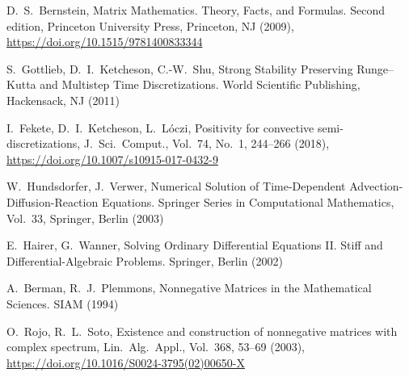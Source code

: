 \documentclass[a4paper]{article}
\begin{document}
\begin{thebibliography}{99}

D.~S.~Bernstein, Matrix Mathematics. Theory, Facts, and Formulas. Second edition, Princeton University Press, Princeton, NJ (2009), \href{https://doi.org/10.1515/9781400833344}{https://doi.org/10.1515/9781400833344}

{S.~Gottlieb,  D.~I.~Ketcheson,  C.-W.~Shu}, {Strong Stability Preserving {R}unge--{K}utta and Multistep Time Discretizations}. {World Scientific Publishing, Hackensack, NJ} ({2011})

I.~Fekete, D.~I.~Ketcheson, L.~L\'oczi, Positivity for convective semi-discretizations, J.~Sci.~Comput., Vol.~74, No.~1, 244--266 (2018), \href{https://doi.org/10.1007/s10915-017-0432-9}{https://doi.org/10.1007/s10915-017-0432-9}


W.~Hundsdorfer, J.~Verwer, Numerical Solution of Time-Dependent Advection-Diffusion-Reaction
Equations. Springer Series in Computational Mathematics, Vol.~33, Springer, Berlin (2003)    

E.~Hairer, G.~Wanner, Solving Ordinary Differential Equations II. Stiff
and Differential-Algebraic Problems. Springer, Berlin (2002)

 A.~Berman, R.~J.~Plemmons, Nonnegative Matrices in the Mathematical Sciences. SIAM (1994)
 
O.~Rojo, R.~L.~Soto, Existence and construction of nonnegative matrices with complex spectrum, 
Lin.~Alg.~Appl., Vol.~368, 53--69 (2003), \href{https://doi.org/10.1016/S0024-3795(02)00650-X}{https://doi.org/10.1016/S0024-3795(02)00650-X}



\end{thebibliography}
\end{document}
